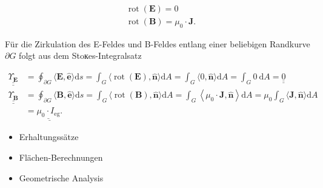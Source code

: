 \documentclass[10pt]{article}
\begin{document}
\begin{align*}
& \operatorname{rot}(\mathbf{E})=0  \tag{2.177}\\
& \operatorname{rot}(\mathbf{B})=\mu_{0} \cdot \mathbf{J} . \tag{2.178}
\end{align*}


Für die Zirkulation des E-Feldes und B-Feldes entlang einer beliebigen Randkurve $\partial G$ folgt aus dem Stoкes-Integralsatz


\begin{align*}
\underline{\underline{\Upsilon_{\mathbf{E}}}} & =\oint_{\partial G}\langle\mathbf{E}, \hat{\mathbf{e}}\rangle \mathrm{d} s=\int_{G}\langle\operatorname{rot}(\mathbf{E}), \hat{\mathbf{n}}\rangle \mathrm{d} A=\int_{G}\langle 0, \hat{\mathbf{n}}\rangle \mathrm{d} A=\int_{G} 0 \mathrm{~d} A=\underline{\underline{0}}  \tag{2.179}\\
\underline{\underline{\Upsilon_{\mathbf{B}}}} & =\oint_{\partial G}\langle\mathbf{B}, \hat{\mathbf{e}}\rangle \mathrm{d} s=\int_{G}\langle\operatorname{rot}(\mathbf{B}), \hat{\mathbf{n}}\rangle \mathrm{d} A=\int_{G}\left\langle\mu_{0} \cdot \mathbf{J}, \hat{\mathbf{n}}\right\rangle \mathrm{d} A=\mu_{0} \int_{G}\langle\mathbf{J}, \hat{\mathbf{n}}\rangle \mathrm{d} A \\
& =\underline{\underline{\mu_{0} \cdot I_{\mathrm{eg}}} .} \tag{2.180}
\end{align*}


\begin{itemize}
  \item Erhaltungssätze
  \item Flächen-Berechnungen
  \item Geometrische Analysis
\end{itemize}
\end{document}
